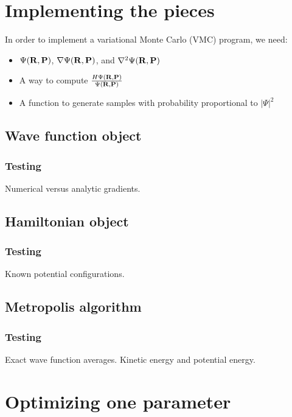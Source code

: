 \documentclass[12pt]{article}
\newcommand{\bR}{{\bf R}}
\newcommand{\bP}{{\bf P}}
\begin{document}
\section{Implementing the pieces}

In order to implement a variational Monte Carlo (VMC) program, we need:
\begin{itemize}
	\item $\Psi(\bR,\bP)$, $\nabla \Psi(\bR,\bP)$, and $\nabla^2 \Psi(\bR,\bP)$
	\item A way to compute $\frac{H\Psi(\bR,\bP)}{\Psi(\bR,\bP)}$
	\item A function to generate samples with probability proportional to $|\Psi|^2$
\end{itemize}

\subsection{Wave function object}

\subsubsection{Testing}

Numerical versus analytic gradients.

\subsection{Hamiltonian object}



\subsubsection{Testing}

Known potential configurations.

\subsection{Metropolis algorithm}

\subsubsection{Testing}

Exact wave function averages. Kinetic energy and potential energy.

\section{Optimizing one parameter}
\end{document}

